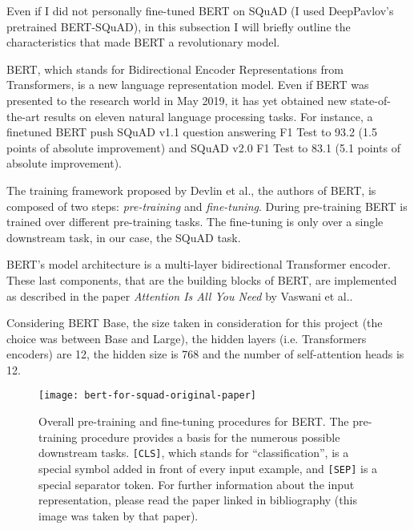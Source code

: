 Even if I did not personally fine-tuned BERT on SQuAD (I used DeepPavlov's pretrained BERT-SQuAD), in this subsection I will briefly outline the characteristics that made BERT a revolutionary model.

BERT, which stands for Bidirectional Encoder Representations from Transformers, is a new language representation model. Even if BERT was presented to the research world in May 2019, it has yet obtained new state-of-the-art results on eleven natural language processing tasks. For instance, a finetuned BERT push SQuAD v1.1 question answering F1 Test to 93.2 (1.5 points of absolute improvement) and SQuAD v2.0 F1 Test to 83.1 (5.1 points of absolute improvement).

The training framework proposed by Devlin et al., the authors of BERT, is composed of two steps: \textit{pre-training} and \textit{fine-tuning}. During pre-training BERT is trained over different pre-training tasks. The fine-tuning is only over a single downstream task, in our case, the SQuAD task.

BERT’s  model  architecture is a multi-layer bidirectional Transformer encoder. These last components, that are the building blocks of BERT, are implemented as described in the paper \textit{Attention Is All You Need} by Vaswani et al..

Considering BERT Base, the size taken in consideration for this project (the choice was between Base and Large), the hidden layers (i.e. Transformers encoders) are 12, the hidden size is 768 and the number of self-attention heads is 12.

\begin{figure}[t]
\centering
\texttt{[image: bert-for-squad-original-paper]}
\caption{Overall pre-training and fine-tuning procedures for BERT. The pre-training procedure provides a basis for the numerous possible downstream tasks. \texttt{[CLS]}, which stands for ``classification'', is a special symbol added in front of every input example, and \texttt{[SEP]} is a special separator token. For further information about the input representation, please read the paper linked in bibliography (this image was taken by that paper).}
\medskip
\end{figure}

